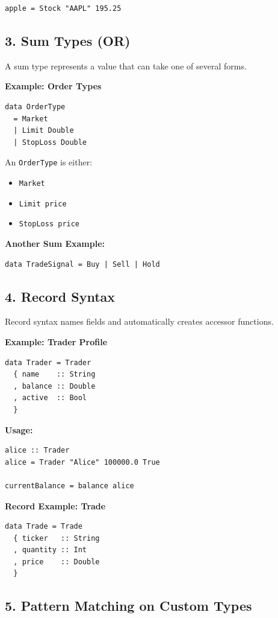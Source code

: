 \documentclass[12pt]{article}
\begin{document}
\begin{verbatim}
apple = Stock "AAPL" 195.25
\end{verbatim}

\subsection{3. Sum Types (OR)}

A sum type represents a value that can take one of several forms.

\textbf{Example: Order Types}
\begin{verbatim}
data OrderType
  = Market
  | Limit Double
  | StopLoss Double
\end{verbatim}

An \texttt{OrderType} is either:
\begin{itemize}
  \item \texttt{Market}
  \item \texttt{Limit price}
  \item \texttt{StopLoss price}
\end{itemize}

\textbf{Another Sum Example:}
\begin{verbatim}
data TradeSignal = Buy | Sell | Hold
\end{verbatim}

\subsection{4. Record Syntax}

Record syntax names fields and automatically creates accessor functions.

\textbf{Example: Trader Profile}
\begin{verbatim}
data Trader = Trader
  { name    :: String
  , balance :: Double
  , active  :: Bool
  }
\end{verbatim}

\textbf{Usage:}
\begin{verbatim}
alice :: Trader
alice = Trader "Alice" 100000.0 True

currentBalance = balance alice
\end{verbatim}

\textbf{Record Example: Trade}
\begin{verbatim}
data Trade = Trade
  { ticker   :: String
  , quantity :: Int
  , price    :: Double
  }
\end{verbatim}

\subsection{5. Pattern Matching on Custom Types}
\end{document}

